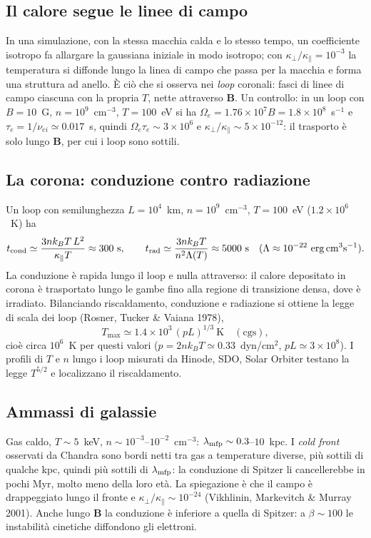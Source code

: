 \subsection{Il calore segue le linee di campo}
In una simulazione, con la stessa macchia calda e lo stesso tempo, un coefficiente isotropo fa allargare la gaussiana iniziale in modo isotropo; con $\kappa_\perp/\kappa_\parallel=10^{-3}$ la temperatura si diffonde lungo la linea di campo che passa per la macchia e forma una struttura ad anello. È ciò che si osserva nei \emph{loop} coronali: fasci di linee di campo ciascuna con la propria $T$, nette attraverso $\mathbf{B}$.
Un controllo: in un loop con $B=10$~G, $n=10^9$~cm$^{-3}$, $T=100$~eV si ha $\Omega_e=1.76\times10^7B=1.8\times10^8$~s$^{-1}$ e $\tau_e=1/\nu_{ei}\simeq0.017$~s, quindi $\Omega_e\tau_e\sim3\times10^6$ e $\kappa_\perp/\kappa_\parallel\sim5\times10^{-12}$: il trasporto è solo lungo $\mathbf{B}$, per cui i loop sono sottili.

\subsection{La corona: conduzione contro radiazione}
Un loop con semilunghezza $L=10^4$~km, $n=10^9$~cm$^{-3}$, $T=100$~eV ($1.2\times10^6$~K) ha
\begin{equation}
t_{\rm cond}\simeq\frac{3nk_BT\,L^2}{\kappa_\parallel T}\approx300\ \mathrm{s},\qquad t_{\rm rad}\simeq\frac{3nk_BT}{n^2\Lambda(T)}\approx5000\ \mathrm{s}\quad(\Lambda\approx10^{-22}\ \mathrm{erg\,cm^3s^{-1}}).
\end{equation}
La conduzione è rapida lungo il loop e nulla attraverso: il calore depositato in corona è trasportato lungo le gambe fino alla regione di transizione densa, dove è irradiato. Bilanciando riscaldamento, conduzione e radiazione si ottiene la legge di scala dei loop (Rosner, Tucker \& Vaiana 1978),
\begin{equation}
T_{\max}\simeq1.4\times10^3\,(pL)^{1/3}\ \mathrm{K}\quad(\mathrm{cgs}),
\end{equation}
cioè circa $10^6$~K per questi valori ($p=2nk_BT\simeq0.33$~dyn/cm$^2$, $pL\simeq3\times10^8$). I profili di $T$ e $n$ lungo i loop misurati da Hinode, SDO, Solar Orbiter testano la legge $T^{5/2}$ e localizzano il riscaldamento.

\subsection{Ammassi di galassie}
Gas caldo, $T\sim5$~keV, $n\sim10^{-3}$--$10^{-2}$~cm$^{-3}$: $\lambda_{\rm mfp}\sim0.3$--$10$~kpc. I \emph{cold front} osservati da Chandra sono bordi netti tra gas a temperature diverse, più sottili di qualche kpc, quindi più sottili di $\lambda_{\rm mfp}$: la conduzione di Spitzer li cancellerebbe in pochi Myr, molto meno della loro età. La spiegazione è che il campo è drappeggiato lungo il fronte e $\kappa_\perp/\kappa_\parallel\sim10^{-24}$ (Vikhlinin, Markevitch \& Murray 2001). Anche lungo $\mathbf{B}$ la conduzione è inferiore a quella di Spitzer: a $\beta\sim100$ le instabilità cinetiche diffondono gli elettroni.

